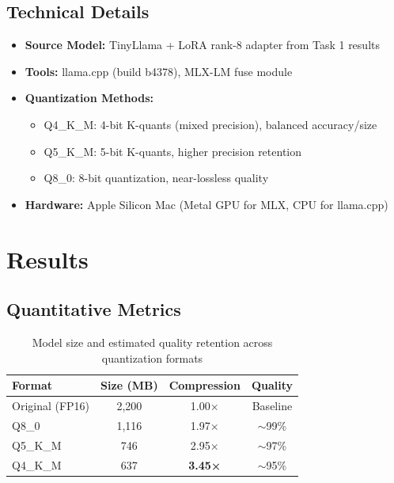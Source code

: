 \documentclass[11pt,a4paper]{article}
\begin{document}
\subsection*{Technical Details}
\begin{itemize}
    \item \textbf{Source Model:} TinyLlama + LoRA rank-8 adapter from Task 1 results
    \item \textbf{Tools:} llama.cpp (build b4378), MLX-LM fuse module
    \item \textbf{Quantization Methods:}
    \begin{itemize}
        \item Q4\_K\_M: 4-bit K-quants (mixed precision), balanced accuracy/size
        \item Q5\_K\_M: 5-bit K-quants, higher precision retention
        \item Q8\_0: 8-bit quantization, near-lossless quality
    \end{itemize}
    \item \textbf{Hardware:} Apple Silicon Mac (Metal GPU for MLX, CPU for llama.cpp)
\end{itemize}

\section*{Results}

\subsection*{Quantitative Metrics}
\begin{table}[H]
\centering
\small
\begin{tabular}{@{}lccc@{}}
\toprule
\textbf{Format} & \textbf{Size (MB)} & \textbf{Compression} & \textbf{Quality} \\
\midrule
Original (FP16) & 2,200 & 1.00× & Baseline \\
Q8\_0 & 1,116 & 1.97× & $\sim$99\% \\
Q5\_K\_M & 746 & 2.95× & $\sim$97\% \\
Q4\_K\_M & 637 & \textbf{3.45×} & $\sim$95\% \\
\bottomrule
\end{tabular}
\caption{Model size and estimated quality retention across quantization formats}
\end{table}
\end{document}
